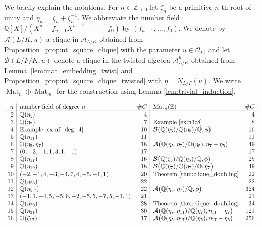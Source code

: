 \documentclass{amsart}
\theoremstyle{plain}
\theoremstyle{definition}
\DeclareMathOperator{\Mat}{Mat}
\newcommand{\A}{\mathcal{A}}
\newcommand{\Z}{\ensuremath{\mathbb{Z}}}
\newcommand{\Q}{\ensuremath{\mathbb{Q}}}
\newcommand{\clq}{C}
\begin{document}
We briefly explain the notations. For \(n\in\Z_{>0}\) let \(\zeta_n\) be a primitive \(n\)-th root of unity and \(\eta_n=\zeta_n+\zeta_n^{-1}\). We abbreviate the number field \(\Q[X]/(X^n+f_{n-1}X^{n-1}+\dotsm+f_0)\) by \((f_{n-1},\dotsc,f_0)\).
We denote by \(\A(L/K,u)\) a clique in \(\mathcal{A}_{L/K}\) obtained from Proposition~\ref{prop:nt_square_clique} with the parameter \(u\in\mathcal{O}_L\), and let \(\mathcal{B}(L/F/K,u)\) denote a clique in the twisted algebra \(\mathcal{A}_{L/K}^u\) obtained from Lemma~\ref{lem:mat_embedding_twist} and Proposition~\ref{prop:nt_square_clique_twisted} with $\eta=N_{L/F}(u)$.  We write $\Mat_n\oplus\Mat_m$ for the construction using Lemma \ref{lem:trivial_induction}.


\begin{align*}
	\begin{array}{r|lr|lr}
		n & \textup{number field of degree \(n\)} & \#\clq & \textup{Mat}_n(\Z) & \# \clq \\ \hline
		2 & \Q(\eta_5) & 4 & & 4 \\ 
		3 & \Q(\eta_7) & 7 & \text{Example~\ref{ex:n3c8}} & 8 \\
		4 & \text{Example~\ref{ex:nf_deg_4}} & 10 & \mathcal{B}\big(\Q(\eta_5)/\Q(\eta_5)/\Q,\phi\big) & 16 \\
		5 & \Q(\eta_{11}) & 11 & & 11 \\ 
		6 & \Q(\eta_{5}, \eta_{7}) & 18 & \A\big(\Q(\eta_5,\eta_7)/\Q(\eta_5),\eta_7-\eta_5\big) & 49 \\
		7 & (0,-3,-1,1,3,1,-1) & 17 & & 17 \\ 
		8 & \Q(\eta_{17}) & 16 & \mathcal{B}\big(\Q(\zeta_5)/\Q(\eta_5)/\Q,\phi\big)  & 25 \\
		9 & \Q(\eta_{19}) & 18 & \mathcal{B}\big(\Q(\eta_7)/\Q(\eta_7)/\Q,\eta_7\big)  & 49 \\
		10& (-2,-1,4,-3,-4,7,4,-5,-1,1) & 20 & \textup{Theorem~\ref{thm:clique_doubling}}  & 22 \\
		11& \Q(\eta_{23}) & 22 &   & 22 \\
		12& \Q(\eta_{5\cdot 7}) & 22 & \A\big(\Q(\eta_5,\eta_7)/\Q,\phi\big)  & 324 \\
		13& (-1,1,-4,5,-5,6,-2,-5,5,-7,5,-1,1) & 21 & & 21 \\
		14& \Q(\eta_{29}) & 28 & \textup{Theorem~\ref{thm:clique_doubling}} & 34 \\
		15& \Q(\eta_{31}) & 30 & \A\big(\Q(\eta_7,\eta_{11})/\Q(\eta_7),\eta_{11}-\eta_7\big) & 121 \\
		16& \Q(\zeta_{17}) & 17 & \A\big(\Q(\eta_5,\eta_{17})/\Q(\eta_5),\eta_{17}-\eta_5\big) & 256 \\

\end{array}
\end{align*}
\end{document}
